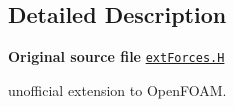 \subsection{Detailed Description}
{\bfseries Original source file} \href{../../../home/carlo/data/GeN-Foam/GeN-Foam_ffn/GeN-Foam/GeN-Foam/FMU4FOAM/ECI4FOAM/src/externalComm/externalIO/output/extForces/extForces.H}{\tt ext\+Forces.\+H}

\begin{DoxyVerb}unofficial extension to OpenFOAM.\end{DoxyVerb}
